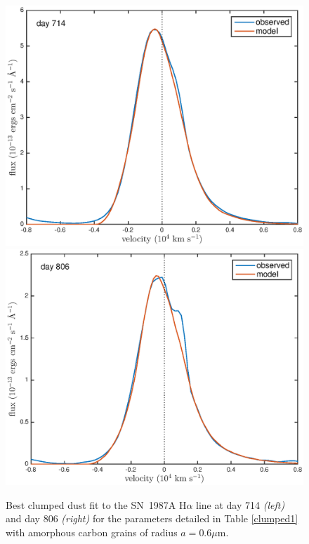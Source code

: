 \documentclass[useAMS,usenatbib,usegraphicx]{mnras}
\begin{document}
 \begin{figure}
\begin{center}
\includegraphics[trim =33 10 45 15,clip=true,scale=0.47]{clump_1/best_fit/d714Ha_new}
\includegraphics[trim =33 10 45 15,clip=true,scale=0.47]{clump_1/best_fit/d806Ha_new}
\caption{Best clumped dust fit to the SN~1987A H$\alpha$ line at day 714 \textit{\textit{(left)}} and day 806 \textit{\textit{(right)}} for the parameters detailed in Table \ref{clumped1} with amorphous carbon grains of radius $a=0.6 \mu$m.}
\label{Ha_clump1}
\end{center}
\end{figure}
\end{document}
